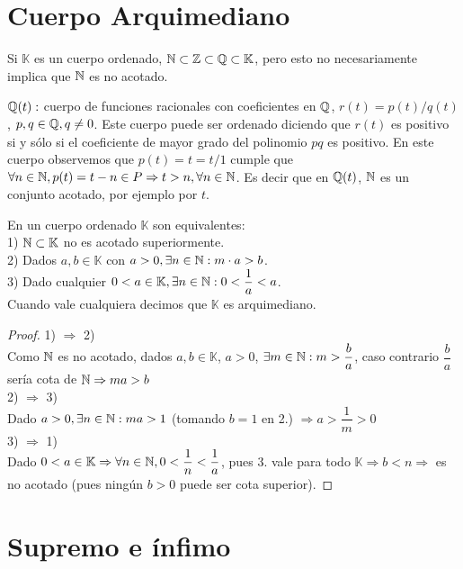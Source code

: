 \section{Cuerpo Arquimediano}

Si $\mathbb{K}$ es un cuerpo ordenado, $\mathbb{N} \subset \mathbb{Z} \subset \mathbb{Q} \subset \mathbb{K}$, pero esto no necesariamente implica que $\mathbb{N}$ es no acotado. 

\begin{eg}
    $\mathbb{Q}(t):$ cuerpo de funciones racionales con coeficientes en $\mathbb{Q}$, $r(t) = p(t)/q(t)$, $p, q \in \mathbb{Q}, q \neq 0$. Este cuerpo puede ser ordenado diciendo que $r(t)$ es positivo si y sólo si el coeficiente de mayor grado del polinomio $pq$ es positivo.
    En este cuerpo observemos que $p(t)=t=t/1$ cumple que $\forall n \in \mathbb{N}, p(t)=t-n \in P \Rightarrow t>n, \forall n \in \mathbb{N}$. Es decir que en $\mathbb{Q}(t)$, $\mathbb{N}$ es un conjunto acotado, por ejemplo por $t$.
\end{eg}

\begin{theorem}
    En un cuerpo ordenado $\mathbb{K}$ son equivalentes: \\
    1) $\mathbb{N} \subset \mathbb{K}$ no es acotado superiormente. \\ 
    2) Dados $a, b \in \mathbb{K}$ con $a>0, \exists n \in \mathbb{N}:m \cdot a>b$. \\
    3) Dado cualquier $0<a \in \mathbb{K}, \exists n \in \mathbb{N} : 0 < \dfrac{1}a < a$. \\
    Cuando vale cualquiera decimos que $\mathbb{K}$ es arquimediano.
    \begin{proof}
        1) $\Rightarrow$ 2) \\
        Como $\mathbb{N}$ es no acotado, dados $a,b \in \mathbb{K}$, $a>0$, $\exists m \in \mathbb{N} : m > \dfrac ba$, caso contrario $\dfrac ba$ sería cota de $\mathbb{N} \Rightarrow ma>b$ \\
        2) $\Rightarrow$ 3) \\
        Dado $a>0, \exists n \in \mathbb{N} : ma>1$ (tomando $b=1$ en 2.) $\Rightarrow a>\dfrac 1m >0$ \\
        3) $\Rightarrow$ 1) \\
        Dado $0<a \in \mathbb{K} \Rightarrow \forall n \in \mathbb{N}, 0<\dfrac 1n<\dfrac 1a$, pues 3. vale para todo $\mathbb{K} \Rightarrow b<n \Rightarrow$ es no acotado (pues ningún $b>0$ puede ser cota superior).
    \end{proof}
\end{theorem}


\section{Supremo e ínfimo}


